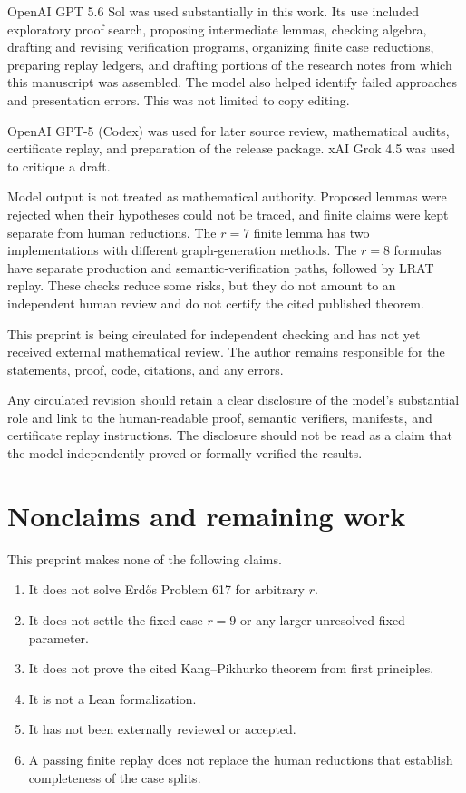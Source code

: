 \documentclass[11pt,reqno,a4paper]{amsart}
\theoremstyle{definition}
\theoremstyle{remark}
\begin{document}
OpenAI GPT 5.6 Sol was used substantially in this work. Its use included
exploratory proof search, proposing intermediate lemmas, checking algebra,
drafting and revising verification programs, organizing finite case
reductions, preparing replay ledgers, and drafting portions of the research
notes from which this manuscript was assembled. The model
also helped identify failed approaches and presentation errors. This was
not limited to copy editing.

OpenAI GPT-5 (Codex) was used for later source review, mathematical audits,
certificate replay, and preparation of the release package. xAI Grok 4.5
was used to critique a draft.

Model output is not treated as mathematical authority. Proposed lemmas were
rejected when their hypotheses could not be traced, and finite claims were
kept separate from human reductions. The $r=7$ finite lemma has two
implementations with different graph-generation methods. The $r=8$
formulas have separate production and semantic-verification paths, followed
by LRAT replay. These checks reduce some risks, but they do not amount to an
independent human review and do not certify the cited published theorem.

This preprint is being circulated for independent checking and has not yet
received external mathematical review. The author remains responsible for
the statements, proof, code, citations, and any errors.

Any circulated revision should retain a clear disclosure of the model's
substantial role and link to the human-readable proof, semantic verifiers,
manifests, and certificate replay instructions. The disclosure should not
be read as a claim that the model independently proved or formally verified
the results.

\section{Nonclaims and remaining work}\label{sec:nonclaims}

This preprint makes none of the following claims.
\begin{enumerate}[label=\textup{N\arabic*.},leftmargin=2.8em]
\item It does not solve Erd\H{o}s Problem 617 for arbitrary $r$.
\item It does not settle the fixed case $r=9$ or any larger unresolved
  fixed parameter.
\item It does not prove the cited Kang--Pikhurko theorem from first
  principles.
\item It is not a Lean formalization.
\item It has not been externally reviewed or accepted.
\item A passing finite replay does not replace the human reductions that
  establish completeness of the case splits.
\end{enumerate}
\end{document}
